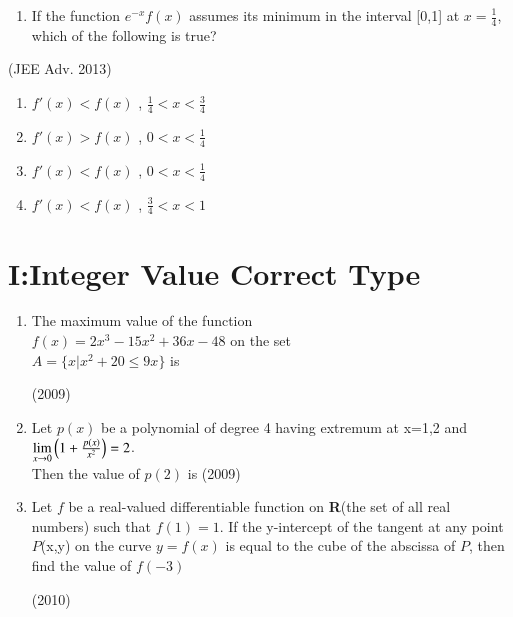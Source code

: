 \documentclass[journal,,12pt,twocolumn]{IEEEtran}
\theoremstyle{remark}
\begin{document}
\begin{enumerate}
\begin{enumerate}
\end{enumerate}


\item If the function $e^{-x}f(x)$ assumes its minimum in the interval [0,1] at $x=\frac{1}{4}$, which of the following is true?
\end{enumerate}

\hfill{(JEE Adv. 2013)}

\begin{enumerate}[label=\alph*)]
\item $f'(x)<f(x)$ , $\frac{1}{4}<x<\frac{3}{4}$ \\

\item $f'(x)>f(x)$ , $0<x<\frac{1}{4}$ \\ 

\item $f'(x)<f(x)$ , $0<x<\frac{1}{4}$ \\

\item $f'(x)<f(x)$ , $\frac{3}{4}<x<1$ \\
\end{enumerate}


\section*{I:Integer Value Correct Type}

\begin{enumerate}
\item The maximum value of the function \\
$f(x)=2x^3-15x^2+36x-48$ on the set\\
$A=\{x|x^2+20 \le 9x\}$ is

\hfill {(2009)}

\item Let $p(x)$ be a polynomial of degree 4 having extremum at x=1,2 and $\lim \limits_{x\to 0} \left(1+\frac{p(x)}{x^2}\right) = 2$.\\
Then the value of $p(2)$ is
\hfill{(2009)}
\item Let $f$ be a real-valued differentiable function on \textbf{R}(the set of all real numbers) such that $f(1)=1$. If the y-intercept of the tangent at any point $P$(x,y) on the curve $y=f(x)$ is equal to the cube of the abscissa of $P$, then find the value of $f(-3)$

    \hfill {(2010)}


\end{enumerate}
\end{document}
